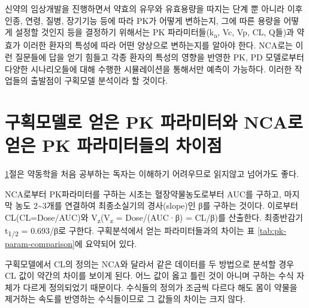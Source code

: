 \documentclass[
  11pt,
  krantz2, a4paper, twoside]{krantz}
\theoremstyle{definition}
\theoremstyle{definition}
\theoremstyle{definition}
\theoremstyle{definition}
\theoremstyle{remark}
\begin{document}
신약의 임상개발을 진행하면서 약효의 유무와 유효용량을 따지는 단계 뿐
아니라 이후 인종, 연령, 질병, 장기기능 등에 따라 PK가 어떻게 변하는지,
그에 따른 용량을 어떻게 설정할 것인지 등을 결정하기 위해서는 PK
파라미터들(k\textsubscript{a}, Vc, Vp, CL, Q들)과 약효가 이러한 환자의 특성에 따라 어떤
양상으로 변하는지를 알아야 한다. NCA로는 이런 질문들에 답을 얻기 힘들고
각종 환자의 특성의 영향을 반영한 PK, PD 모델로부터 다양한
시나리오들에 대해 수행한 시뮬레이션을 통해서만 예측이 가능하다. 이러한
작업들의 출발점이 구획모델 분석이라 할 것이다.

\hypertarget{diff-pk-param}{%
\section{구획모델로 얻은 PK 파라미터와 NCA로 얻은 PK 파라미터들의 차이점}\label{diff-pk-param}}

\ref{diff-pk-param}절은 약동학을 처음 공부하는 독자는 이해하기 어려우므로 읽지않고
넘어가도 좋다.

NCA로부터 PK파라미터를 구하는 시초는 혈장약물농도로부터 AUC를 구하고, 마지막 농도 2\textasciitilde3개를 연결하여 최종소실기의 경사(slope)인 β를 구하는 것이다. 이로부터 CL(CL=Dose/AUC)와 V\textsubscript{z}(V\textsubscript{z} = Dose/(AUC·β) = CL/β)를 산출한다. 최종반감기 t\textsubscript{1/2} = 0.693/β로 구한다. 구획분석에서 얻는 파라미터들과의 차이는 표 \ref{tab:pk-param-comparison}에 요약되어 있다.

구획모델에서 CL의 정의는 NCA와 달라서 같은 데이터를 두 방법으로 분석할 경우 CL 값이 약간의 차이를 보이게 된다. 어느 값이 옳고 틀린 것이 아니며 구하는 수식 자체가 다르게 정의되었기 때문이다.
수식들의 정의가 조금씩 다르다 해도 몸이 약물을 제거하는 속도를 반영하는 수식들이므로 그 값들의 차이는 크지 않다.

\tiny
\end{document}
